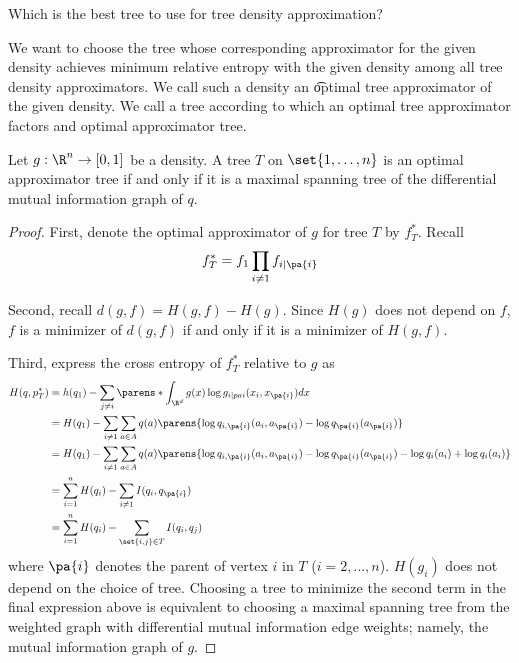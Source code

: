 

Which is the best tree to use for tree density approximation?


We want to choose the tree whose corresponding approximator for the given density achieves minimum relative entropy with the given density among all tree density approximators.
We call such a density an \t{optimal tree approximator} of the given density.
We call a tree according to which an optimal tree approximator factors and optimal approximator tree.


\begin{prop}

Let $g: \R^n \to [0, 1]$ be a density.
A tree $T$ on $\set{1, \dots, n}$ is an optimal approximator tree if and only if it is a maximal spanning tree of the differential mutual information graph of $q$.

\begin{proof}
First, denote the optimal approximator of $g$ for tree $T$ by $f^*_T$. Recall
$$
  f^*_T = f_1 \prod_{i \neq 1} f_{i \mid \pa{i}}
$$

Second, recall $d(g, f) = H(g, f) - H(g)$.
Since $H(g)$ does not depend on $f$, $f$ is a minimizer of $d(g, f)$ if and only if it is a minimizer of $H(g, f)$.

Third, express the cross entropy of $f^*_T$ relative to $g$ as
$$
\begin{aligned}
  H(q, p^*_T) &= h(q_1) - \sum_{j \neq i} \parens*{ \int_{\R^d} g(x) \log g_{i \mid pa{i}}(x_i, x_{\pa{i}}) dx } \\
              &= H(q_1) - \sum_{i \neq 1} \sum_{a \in A} q(a)\parens{\log q_{i,\pa{i}}(a_i, a_{\pa{i}}) - \log q_{\pa{i}}(a_{\pa{i}})} \\
              &= H(q_1) - \sum_{i \neq 1} \sum_{a \in A} q(a)\parens{\log q_{i,\pa{i}}(a_i, a_{\pa{i}}) - \log q_{\pa{i}}(a_{\pa{i}}) - \log q_i(a_i)  + \log q_{i}(a_i)} \\
              &= \sum_{i = 1}^{n} H(q_i) - \sum_{i \neq 1} I(q_i, q_{\pa{i}}) \\
              &= \sum_{i = 1}^{n} H(q_i) - \sum_{\set{i,j} \in T} I(q_i, q_{j}) \\
\end{aligned}
$$
where $\pa{i}$ denotes the parent of vertex $i$ in $T$ ($i = 2, \dots, n$).
$H(g_i)$ does not depend on the choice of tree.
Choosing a tree to minimize the second term in the final expression above is equivalent to choosing a maximal spanning tree from the weighted graph with differential mutual information edge weights; namely, the mutual information graph of $g$.

\end{proof}

\end{prop}
